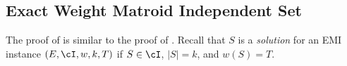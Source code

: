 \subsection{Exact Weight Matroid Independent Set}
\label{sec:abs_EMI}




The proof of  is similar to the proof of .
Recall that $S$ is a {\em solution} for an EMI instance $(E,\cI,w,k,T)$ if $S \in \cI$, $|S| = k$, and $w(S) = T$. 


